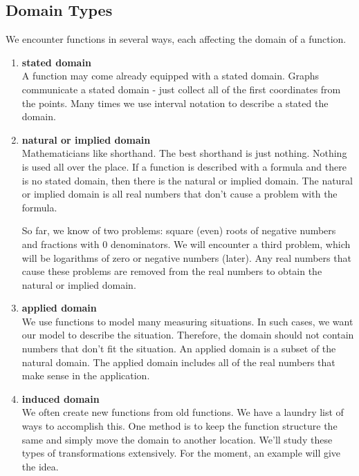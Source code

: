 \documentclass{ximera}
\begin{document}
\subsection*{Domain Types}

We encounter functions in several ways, each affecting the domain of a function.

\begin{enumerate}
\item  \textbf{\textcolor{green!50!black}{stated domain}}   \\
A function may come already equipped with a stated domain.  Graphs communicate a stated domain - just collect all of the first coordinates from the points. Many times we use interval notation to describe a stated the domain.


\item  \textbf{\textcolor{green!50!black}{natural or implied domain}}   \\
Mathematicians like shorthand. The best shorthand is just nothing.  Nothing is used all over the place. If a function is described with a formula and there is no stated domain, then there is the natural or implied domain.  The natural or implied domain is all real numbers that don't cause a problem with the formula.

So far, we know of two problems: square (even) roots of negative numbers and fractions with $0$ denominators.  We will encounter a third problem, which will be logarithms of zero or negative numbers (later). Any real numbers that cause these problems are removed from the real numbers to obtain the natural or implied domain.


\item  \textbf{\textcolor{green!50!black}{applied domain}}   \\
We use functions to model many measuring situations. In such cases, we want our model to describe the situation.  Therefore, the domain should not contain numbers that don't fit the situation. An applied domain is a subset of the natural domain.  The applied domain includes all of the real numbers that make sense in the application.


\item \textbf{\textcolor{green!50!black}{induced domain}}  \\
We often create new functions from old functions. We have a laundry list of ways to accomplish this.  One method is to keep the function structure the same and simply move the domain to another location. We'll study these types of transformations extensively. For the moment, an example will give the idea. \\








\end{enumerate}
\end{document}
